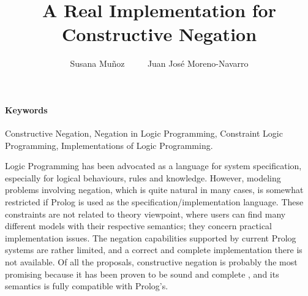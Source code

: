 \documentclass{llncs}
\begin{document}
\title{A Real Implementation for 
       Constructive Negation}

\author{Susana Mu\~{n}oz ~~~~ Juan Jos\'{e} Moreno-Navarro}


\maketitle

\paragraph{\bf Keywords}
Constructive Negation, Negation in Logic Programming, Constraint Logic
Programming, Implementations of Logic Programming.


\vspace{0.3cm}



Logic Programming has been advocated as a language for system
  specification, especially for logical behaviours,
  rules and knowledge. However, modeling problems involving negation,
  which is quite natural in many cases, is somewhat restricted if
  Prolog is used as the specification/implementation language. These
  constraints are not related to theory viewpoint, where users can
  find many different models with their respective semantics; they
  concern practical implementation issues.  The negation capabilities
  supported by current Prolog systems are rather limited, and a
  correct and complete implementation there is not available. Of all
  the proposals, constructive negation \cite{Chan1,Chan2} is probably
  the most promising because it has been proven to be sound and
  complete \cite{Stuckey95}, and its semantics is fully compatible
  with Prolog's.
\end{document}
